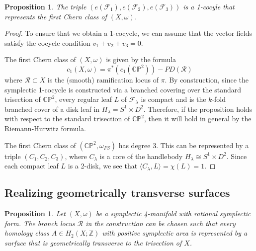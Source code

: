 \documentclass[11pt]{amsart}
\newtheorem{proposition}[theorem]{Proposition}
\theoremstyle{definition}
\theoremstyle{remark}
\numberwithin{equation}{section}
\newcommand{\cR}{\mathcal{R}}
\newcommand{\ZZ}{\mathbb{Z}}
\newcommand{\cF}{\mathcal{F}}
\newcommand{\CP}{\mathbb{CP}}
\begin{document}
\begin{proposition}
    The triple $(e(\cF_1),e(\cF_2),e(\cF_3))$ is a 1-cocyle that represents the first Chern class of $(X,\omega)$.
\end{proposition}

\begin{proof}
    To ensure that we obtain a 1-cocycle, we can assume that the vector fields satisfy the cocycle condition $v_1 + v_2 + v_3 = 0$.

    The first Chern class of $(X,\omega)$ is given by the formula
\[c_1(X,\omega) = \pi^*(c_1(\CP^2)) - PD(\cR)\]
where $\cR \subset X$ is the (smooth) ramification locus of $\pi$.  By construction, since the symplectic 1-cocycle is constructed via a branched covering over the standard trisection of $\CP^2$, every regular leaf $L$ of $\cF_{\lambda}$ is compact and is the $k$-fold branched cover of a disk leaf in $H_{\lambda} = S^1 \times D^2$.  Therefore, if the proposition holds with respect to the standard trisection of $\CP^2$, then it will hold in general by the Riemann-Hurwitz formula.

The first Chern class of $(\CP^2,\omega_{FS})$ has degree 3.  This can be represented by a triple $(C_1,C_2,C_3)$, where $C_{\lambda}$ is a core of the handlebody $H_{\lambda} \cong S^1 \times D^2$.  Since each compact leaf $L$ is a 2-disk, we see that $\langle C_{\lambda},L \rangle = \chi(L) = 1$.  
\end{proof}



\subsection{Realizing geometrically transverse surfaces}

\begin{proposition}
\label{prop:all-line-bundles}
    Let $(X,\omega)$ be a symplectic 4-manifold with rational symplectic form. The branch locus $\cR$ in the construction can be chosen such that every homology class $A \in H_2(X;\ZZ)$ with positive symplectic area is represented by a surface that is geometrically transverse to the trisection of $X$.
\end{proposition}
\end{document}
